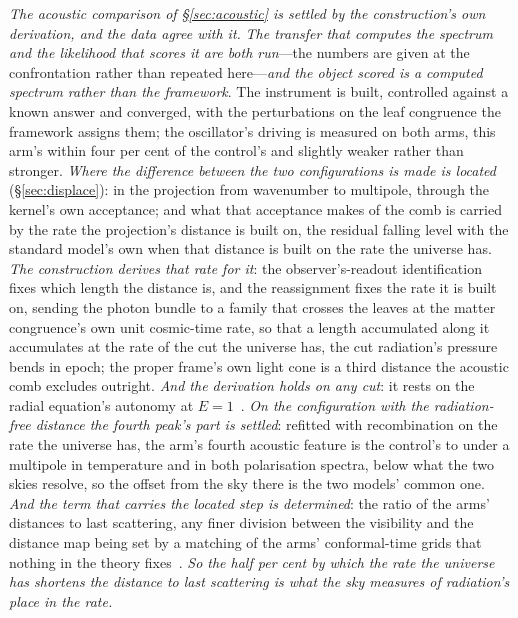 \documentclass[11pt,a4paper]{article}
\theoremstyle{plain}
\theoremstyle{definition}
\begin{document}
\emph{The acoustic comparison of \S\ref{sec:acoustic} is settled by the construction's own derivation, and the data agree with it.} \emph{The transfer that computes the spectrum and the likelihood that scores it are both
run}---the numbers are given at the confrontation rather than repeated here---\emph{and the object scored
is a computed spectrum rather than the framework}. The instrument is built, controlled against a known answer
and converged, with the perturbations on the leaf congruence the framework assigns them; the oscillator's
driving is measured on both arms, this arm's within four per cent of the control's and slightly weaker rather
than stronger. \emph{Where the difference between the two configurations is made is located}
(\S\ref{sec:displace}): in the projection from wavenumber to multipole, through the kernel's own acceptance; and
what that acceptance makes of the comb is carried by the rate the projection's distance is built on, the
residual falling level with the standard model's own when that distance is built on the rate the universe has.
\emph{The construction derives that rate for it}: the observer's-readout identification fixes which length the
distance is, and the reassignment fixes the rate it is built on, sending the photon bundle to a family that
crosses the leaves at the matter congruence's own unit cosmic-time rate, so that a length accumulated along it
accumulates at the rate of the cut the universe has, the cut radiation's pressure bends in epoch; the proper
frame's own light cone is a third distance the acoustic comb excludes outright. \emph{And the derivation holds
on any cut}: it rests on the radial equation's autonomy at $E=1$~\cite{JanzenCRcosmology}. \emph{On the
configuration with the radiation-free distance the fourth peak's part is settled}: refitted with recombination
on the rate the universe has, the arm's fourth acoustic feature is the control's to under a multipole in
temperature and in both polarisation spectra, below what the two skies resolve, so the offset from the sky there
is the two models' common one. \emph{And the term that carries the located step is determined}: the ratio of the
arms' distances to last scattering, any finer division between the visibility and the distance map being set by
a matching of the arms' conformal-time grids that nothing in the theory fixes~\cite{JanzenCRcosmology}. \emph{So
the half per cent by which the rate the universe has shortens the distance to last scattering is what the sky
measures of radiation's place in the rate.}
\end{document}
